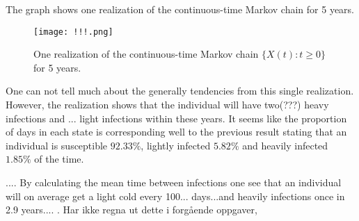 The graph shows one realization of the continuous-time Markov chain for 5 years.

\begin{figure}
    \centering
    \texttt{[image: !!!.png]}
    \caption{One realization of the continuous-time Markov chain $\{X(t):t \geq 0\}$ for 5 years.}
    \label{1realiz5yr}
\end{figure}

One can not tell much about the generally tendencies from this single realization. However, the realization shows that the individual will have two(???) heavy infections and ... light infections within these years. It seems like the proportion of days in each state is corresponding well to the previous result stating that an individual is susceptible $92.33\%$, lightly infected $5.82\%$ and heavily infected $1.85\%$ of the time. 

.... By calculating the mean time between infections one see that an individual will on average get a light cold every 100... days...and heavily infections once in 2.9 years.... . Har ikke regna ut dette i forgående oppgaver, 

